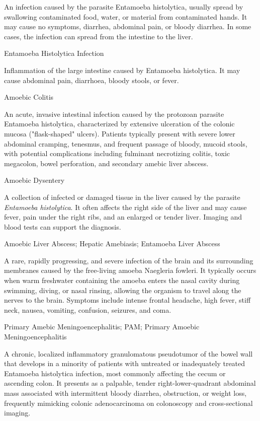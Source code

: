  An infection caused by the parasite Entamoeba histolytica, usually spread by swallowing contaminated food, water, or material from contaminated hands. It may cause no symptoms, diarrhea, abdominal pain, or bloody diarrhea. In some cases, the infection can spread from the intestine to the liver.

\synonyms
Entamoeba Histolytica Infection

 Inflammation of the large intestine caused by Entamoeba histolytica. It may cause abdominal pain, diarrhoea, bloody stools, or fever.

\synonyms
Amoebic Colitis

 An acute, invasive intestinal infection caused by the protozoan parasite Entamoeba histolytica, characterized by extensive ulceration of the colonic mucosa ("flask-shaped" ulcers). Patients typically present with severe lower abdominal cramping, tenesmus, and frequent passage of bloody, mucoid stools, with potential complications including fulminant necrotizing colitis, toxic megacolon, bowel perforation, and secondary amebic liver abscess.

\synonyms
Amoebic Dysentery

 A collection of infected or damaged tissue in the liver caused by the parasite \textit{Entamoeba histolytica}. It often affects the right side of the liver and may cause fever, pain under the right ribs, and an enlarged or tender liver. Imaging and blood tests can support the diagnosis.

\synonyms
Amoebic Liver Abscess; Hepatic Amebiasis; Entamoeba Liver Abscess

 A rare, rapidly progressing, and severe infection of the brain and its surrounding membranes caused by the free-living amoeba Naegleria fowleri. It typically occurs when warm freshwater containing the amoeba enters the nasal cavity during swimming, diving, or nasal rinsing, allowing the organism to travel along the nerves to the brain. Symptoms include intense frontal headache, high fever, stiff neck, nausea, vomiting, confusion, seizures, and coma.

\synonyms
Primary Amebic Meningoencephalitis; PAM; Primary Amoebic Meningoencephalitis

 A chronic, localized inflammatory granulomatous pseudotumor of the bowel wall that develops in a minority of patients with untreated or inadequately treated Entamoeba histolytica infection, most commonly affecting the cecum or ascending colon. It presents as a palpable, tender right-lower-quadrant abdominal mass associated with intermittent bloody diarrhea, obstruction, or weight loss, frequently mimicking colonic adenocarcinoma on colonoscopy and cross-sectional imaging.

